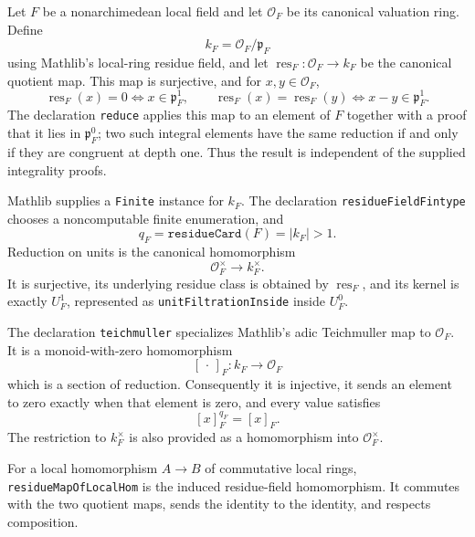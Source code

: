 \begin{definition}\label{mod:localfield-residuefield}
Let $F$ be a nonarchimedean local field and let $\mathcal O_F$ be its
canonical valuation ring.  Define
\[
 k_F=\mathcal O_F/\mathfrak p_F
\]
using Mathlib's local-ring residue field, and let
$\operatorname{res}_F:\mathcal O_F\to k_F$ be the canonical quotient map.
This map is surjective, and for $x,y\in\mathcal O_F$,
\[
 \operatorname{res}_F(x)=0\iff x\in\mathfrak p_F^1,
 \qquad
 \operatorname{res}_F(x)=\operatorname{res}_F(y)
   \iff x-y\in\mathfrak p_F^1.
\]
The declaration \texttt{reduce} applies this map to an element of $F$
together with a proof that it lies in $\mathfrak p_F^0$; two such integral
elements have the same reduction if and only if they are congruent at depth
one.  Thus the result is independent of the supplied integrality proofs.

Mathlib supplies a \texttt{Finite} instance for $k_F$.
The declaration \texttt{residueFieldFintype} chooses a
noncomputable finite enumeration, and
\[
 q_F=\texttt{residueCard}(F)=|k_F|>1.
\]
Reduction on units is the canonical homomorphism
\[
 \mathcal O_F^\times\longrightarrow k_F^\times.
\]
It is surjective, its underlying residue class is obtained by
$\operatorname{res}_F$, and its kernel is exactly $U_F^1$, represented as
\texttt{unitFiltrationInside} inside $U_F^0$.

The declaration \texttt{teichmuller} specializes Mathlib's adic
Teichmuller map to $\mathcal O_F$.  It is a monoid-with-zero homomorphism
\[
 [\,\cdot\,]_F:k_F\longrightarrow\mathcal O_F
\]
which is a section of reduction.  Consequently it is injective, it sends an
element to zero exactly when that element is zero, and every value satisfies
\[
 [x]_F^{q_F}=[x]_F.
\]
The restriction to $k_F^\times$ is also provided as a homomorphism into
$\mathcal O_F^\times$.

For a local homomorphism $A\to B$ of commutative local rings,
\texttt{residueMapOfLocalHom} is the induced residue-field homomorphism.  It
commutes with the two quotient maps, sends the identity to the identity, and
respects composition.


\end{definition}

